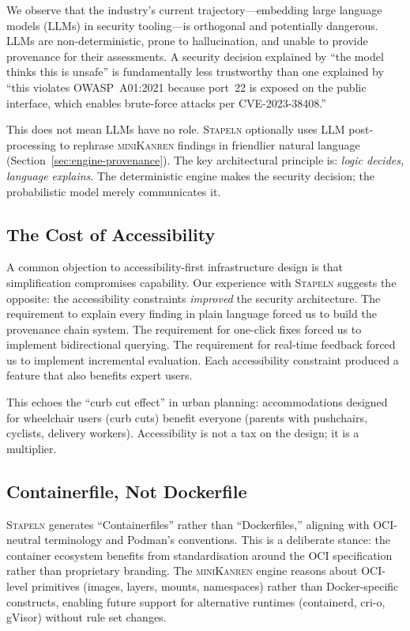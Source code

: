 \documentclass[11pt,twocolumn]{article}
\newcommand{\stapeln}{\textsc{Stapeln}\xspace}
\newcommand{\minikanren}{\textsc{miniKanren}\xspace}
\begin{document}
We observe that the industry's current trajectory---embedding
large language models (LLMs) in security tooling---is orthogonal and
potentially dangerous. LLMs are non-deterministic, prone to
hallucination, and unable to provide provenance for their assessments.
A security decision explained by ``the model thinks this is unsafe''
is fundamentally less trustworthy than one explained by ``this
violates OWASP~A01:2021 because port~22 is exposed on the public
interface, which enables brute-force attacks per CVE-2023-38408.''

This does not mean LLMs have no role. \stapeln optionally uses LLM
post-processing to rephrase \minikanren findings in friendlier
natural language (Section~\ref{sec:engine-provenance}). The key
architectural principle is: \emph{logic decides, language explains}.
The deterministic engine makes the security decision; the
probabilistic model merely communicates it.

\subsection{The Cost of Accessibility}

A common objection to accessibility-first infrastructure design is
that simplification compromises capability. Our experience with
\stapeln suggests the opposite: the accessibility constraints
\emph{improved} the security architecture. The requirement to
explain every finding in plain language forced us to build the
provenance chain system. The requirement for one-click fixes forced
us to implement bidirectional querying. The requirement for real-time
feedback forced us to implement incremental evaluation. Each
accessibility constraint produced a feature that also benefits
expert users.

This echoes the ``curb cut effect'' in urban planning: accommodations
designed for wheelchair users (curb cuts) benefit everyone (parents
with pushchairs, cyclists, delivery workers). Accessibility is not a
tax on the design; it is a multiplier.

\subsection{Containerfile, Not Dockerfile}

\stapeln generates ``Containerfiles'' rather than ``Dockerfiles,''
aligning with OCI-neutral terminology and Podman's conventions. This
is a deliberate stance: the container ecosystem benefits from
standardisation around the OCI specification rather than proprietary
branding. The \minikanren engine reasons about OCI-level primitives
(images, layers, mounts, namespaces) rather than Docker-specific
constructs, enabling future support for alternative runtimes
(containerd, cri-o, gVisor) without rule set changes.
\end{document}

